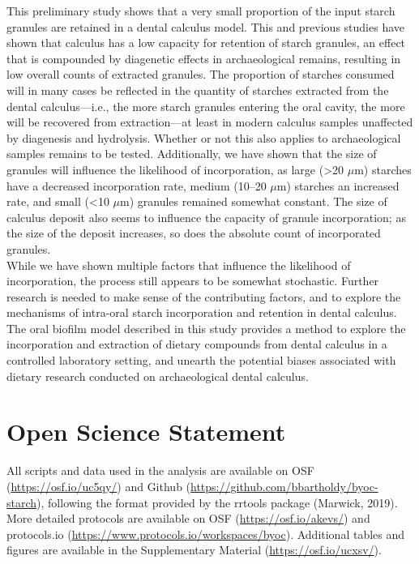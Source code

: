\documentclass[utf8]{frontiers/frontiersSCNS}
\begin{document}
This preliminary study shows that a very small proportion of the input starch
granules are retained in a dental calculus model. This and previous studies
have shown that calculus has a low capacity for retention of starch granules,
an effect that is compounded by diagenetic effects in archaeological remains,
resulting in low overall counts of extracted granules.
The proportion of starches consumed will in many cases be reflected
in the quantity
of starches extracted from the dental calculus---i.e., the more starch granules
entering the oral cavity, the more will be recovered from extraction---at
least in modern calculus samples unaffected by diagenesis and hydrolysis.
Whether or not this also applies to archaeological samples remains to be tested.
Additionally, we have
shown that the size of granules will influence the likelihood of incorporation,
as large (\textgreater20 \(\mu\)m) starches have a decreased incorporation rate, medium
(10--20 \(\mu\)m)
starches an increased rate, and small (\textless10 \(\mu\)m) granules remained somewhat
constant. The size of calculus deposit also seems to influence the capacity of
granule incorporation; as the size of the deposit increases, so does the
absolute count of incorporated granules.\\
While we have shown multiple factors that influence the likelihood
of incorporation, the process still appears to be somewhat stochastic. Further
research is needed to make sense of the contributing factors, and to explore the
mechanisms of intra-oral starch incorporation and retention in dental calculus.
The oral biofilm model described in this study provides a method
to explore the incorporation and extraction of dietary compounds from dental calculus
in a controlled laboratory setting, and unearth the potential biases associated
with dietary research conducted on archaeological dental calculus.

\hypertarget{open-science-statement}{%
\section*{Open Science Statement}\label{open-science-statement}}

All scripts and data used in the analysis are available on OSF
(\url{https://osf.io/uc5qy/}) and Github (\url{https://github.com/bbartholdy/byoc-starch}),
following the format provided by the rrtools package (Marwick, 2019).
More detailed protocols are available on OSF (\url{https://osf.io/akevs/})
and protocols.io (\url{https://www.protocols.io/workspaces/byoc}).
Additional tables and figures are available in the Supplementary Material
(\url{https://osf.io/ucxsv/}).
\end{document}

